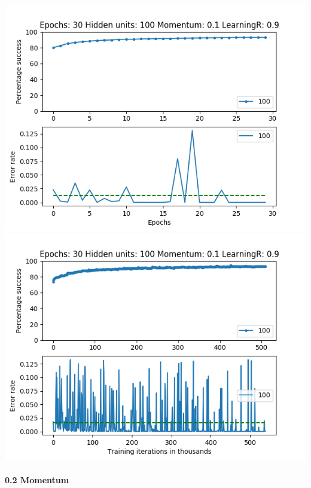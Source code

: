 \documentclass[11pt]{article}
\makeatletter
\def\maxwidth{\ifdim\Gin@nat@width>\linewidth\linewidth
    \else\Gin@nat@width\fi}
\let\Oldincludegraphics\includegraphics
\renewcommand{\includegraphics}[1]{\Oldincludegraphics[width=.8\maxwidth]{#1}}
\makeatother
\begin{document}
\includegraphics{Experiment2/E2_NN_Epoch_Momentum_0.1_30Epochs_100Hiddenunits.png}
\includegraphics{Experiment2/E2_NN_Training_Momentum_0.1_30Epochs_100Hiddenunits.png}

\hypertarget{momentum-2}{%
\paragraph{0.2 Momentum}\label{momentum-2}}
\end{document}
